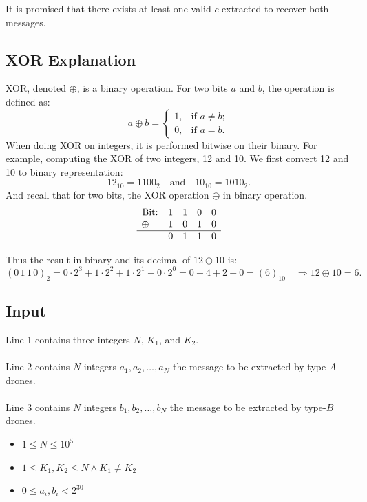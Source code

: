 \documentclass[12pt,a4paper]{article}
\begin{document}
\noindent
It is promised that there exists at least one valid $c$ extracted to recover both messages.

\subsection*{\fontsize{16}{12}XOR Explanation}
XOR, denoted $\oplus$, is a binary operation. For two bits $a$ and $b$, the operation is defined as:
    \[
    a \oplus b =
    \begin{cases}
    1, & \text{if } a \neq b; \\
    0, & \text{if } a = b.
    \end{cases}
    \]
\noindent
When doing XOR on integers, it is performed bitwise on their binary.
For example, computing the XOR of two integers, 12 and 10.
We first convert 12 and 10 to binary representation:
\[
12_{10} = 1100_2 \quad \text{and} \quad 10_{10} = 1010_2.
\]
\noindent
And recall that for two bits, the XOR operation $\oplus$ in binary operation.
\[
\begin{array}{ccccc}
\text{Bit:} & 1 & 1 & 0 & 0 \\
\oplus \quad & 1 & 0 & 1 & 0 \\
\hline&0&1&1&0 \\
\end{array}
\]

\noindent
Thus the result in binary and its decimal of $12\oplus10$ is:
\[
(0\,1\,1\,0)_2 = 0\cdot2^3 + 1\cdot2^2 + 1\cdot2^1 + 0\cdot2^0 = 0 + 4 + 2 + 0 = (6)_{10}\quad
\Rightarrow 12 \oplus 10 = 6.
\]

\subsection*{\fontsize{16}{12}Input}
Line 1 contains three integers $N$, $K_1$, and $K_2$.
\\\\
\noindent
Line 2 contains $N$ integers $a_1, a_2, \dots, a_N$ the message to be extracted by type-$A$ drones.
\\\\
\noindent
Line 3 contains $N$ integers $b_1, b_2, \dots, b_N$ the message to be extracted by type-$B$ drones.

\begin{itemize}
    \item $1 \leq N \leq 10^5$
    \item $1 \leq K_1, K_2 \leq N\wedge K_1 \ne K_2$
    \item $0 \leq a_i, b_i < 2^{30}$
\end{itemize}
\end{document}

